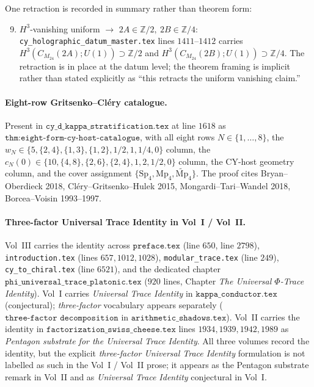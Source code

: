\documentclass[11pt]{article}
\begin{document}
One retraction is recorded in summary rather than theorem form:
\begin{enumerate}
\setcounter{enumi}{8}
\item $H^3$-vanishing uniform $\to$ $2A \in \mathbb{Z}/2,\ 2B \in \mathbb{Z}/4$:
\texttt{cy\_holographic\_datum\_master.tex} lines $1411$--$1412$
carries $H^3(C_{M_{24}}(2A); U(1)) \supset \mathbb{Z}/2$ and
$H^3(C_{M_{24}}(2B); U(1)) \supset \mathbb{Z}/4$. The retraction
is in place at the datum level; the theorem framing is implicit
rather than stated explicitly as ``this retracts the uniform
vanishing claim.''
\end{enumerate}

\paragraph{Eight-row Gritsenko--Cl\'ery catalogue.} Present in
$\texttt{cy\_d\_kappa\_stratification.tex}$ at line $1618$
as $\texttt{thm:eight-form-cy-host-catalogue}$, with all eight
rows $N \in \{1, \ldots, 8\}$, the $w_N \in \{5, \{2, 4\}, \{1, 3\},
\{1, 2\}, 1/2, 1, 1/4, 0\}$ column, the
$c_N(0) \in \{10, \{4, 8\}, \{2, 6\}, \{2, 4\}, 1, 2, 1/2, 0\}$
column, the CY-host geometry column, and the cover assignment
$\{\mathrm{Sp}_4, \mathrm{Mp}_4, \widetilde{\mathrm{Mp}}_4\}$. The
proof cites Bryan--Oberdieck 2018, Cl\'ery--Gritsenko--Hulek 2015,
Mongardi--Tari--Wandel 2018, Borcea--Voisin 1993--1997.

\paragraph{Three-factor Universal Trace Identity in Vol~I / Vol~II.}
Vol~III carries the identity across $\texttt{preface.tex}$
(line $650$, line $2798$), \texttt{introduction.tex}
(lines $657, 1012, 1028$), \texttt{modular\_trace.tex} (line $249$),
\texttt{cy\_to\_chiral.tex} (line $6521$), and the dedicated chapter
$\texttt{phi\_universal\_trace\_platonic.tex}$ ($920$ lines, Chapter
\emph{The Universal $\Phi$-Trace Identity}). Vol~I carries
\emph{Universal Trace Identity} in $\texttt{kappa\_conductor.tex}$
(conjectural); \emph{three-factor} vocabulary appears separately
($\texttt{three-factor decomposition}$ in $\texttt{arithmetic\_shadows.tex}$).
Vol~II carries the identity in
$\texttt{factorization\_swiss\_cheese.tex}$ lines $1934, 1939, 1942, 1989$
as \emph{Pentagon substrate for the Universal Trace Identity}. All
three volumes record the identity, but the explicit \emph{three-factor
Universal Trace Identity} formulation is not labelled as such in the
Vol~I / Vol~II prose; it appears as the Pentagon substrate remark in
Vol~II and as \emph{Universal Trace Identity} conjectural in Vol~I.
\end{document}
